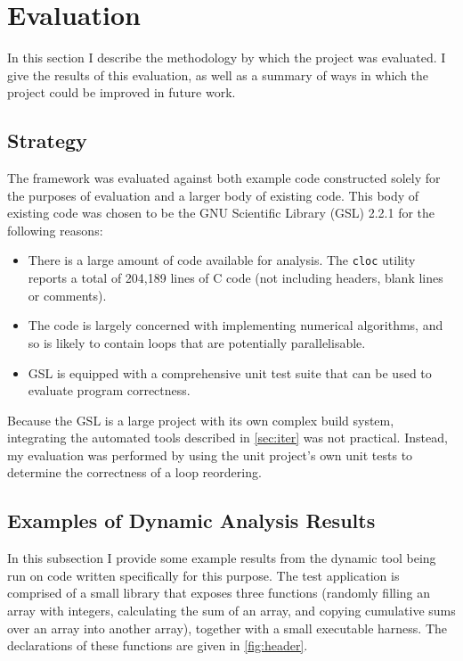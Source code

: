 \documentclass[journal]{IEEEtran}
\begin{document}
\section{Evaluation} \label{sec:eval}

In this section I describe the methodology by which the project was evaluated. I
give the results of this evaluation, as well as a summary of ways in which the
project could be improved in future work.

\subsection{Strategy}

The framework was evaluated against both example code constructed solely for the
purposes of evaluation and a larger body of existing code. This body of existing
code was chosen to be the GNU Scientific Library (GSL) 2.2.1
\cite{gough_gnu_2009} for the following reasons:

\begin{itemize}
  \item There is a large amount of code available for analysis. The
    \texttt{cloc} utility \cite{_aldanial/cloc_????} reports a total of 204,189
    lines of C code (not including headers, blank lines or comments).
  \item The code is largely concerned with implementing numerical algorithms,
    and so is likely to contain loops that are potentially parallelisable.
  \item GSL is equipped with a comprehensive unit test suite that can be used to
    evaluate program correctness.
\end{itemize}

Because the GSL is a large project with its own complex build system,
integrating the automated tools described in \autoref{sec:iter} was not
practical. Instead, my evaluation was performed by using the unit project's own
unit tests to determine the correctness of a loop reordering.

\subsection{Examples of Dynamic Analysis Results}

In this subsection I provide some example results from the dynamic tool being
run on code written specifically for this purpose. The test application is
comprised of a small library that exposes three functions (randomly filling an
array with integers, calculating the sum of an array, and copying cumulative
sums over an array into another array), together with a small executable
harness. The declarations of these functions are given in
\autoref{fig:header}.
\end{document}
